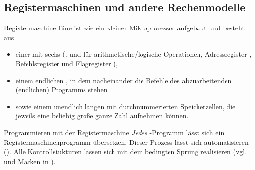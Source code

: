 \addtocounter{subsection}{4}

\subsection{%
    Registermaschinen und andere Rechenmodelle%
}

\begin{Def}{Registermaschine}
    Eine  ist wie ein kleiner Mikroprozessor
    aufgebaut und besteht aus
    \begin{itemize}
        \item einer  mit sechs 
        (,  und  für
        arithmetische/logische Operationen,
        Adressregister , Befehlsregister 
        und Flagregister ),
        
        \item einem endlichen , in dem nacheinander
        die Befehle
        des abzuarbeitenden (endlichen) Programms stehen
        
        \item sowie einem unendlich langen  mit
        durchnummerierten Speicherzellen, die jeweils eine beliebig große ganze
        Zahl aufnehmen können.
    \end{itemize}
\end{Def}

\begin{Def}{Programmieren mit der Registermaschine}
    \emph{Jedes} \Ada{}-Programm lässt sich ein Registermaschinenprogramm
    übersetzen.
    Dieser Prozess lässt sich automatisieren ().
    Alle Kontrollstukturen lassen sich mit dem bedingten Sprung
     realisieren (vgl.  und Marken in \Ada{}).
\end{Def}

\pagebreak


